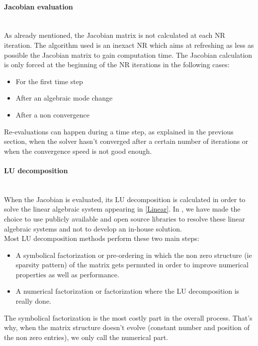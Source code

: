 \documentclass[a4paper, 12pt]{report}
\begin{document}
\paragraph{Jacobian evaluation}
~~\\

As already mentioned, the Jacobian matrix is not calculated at each \ac{NR} iteration. The algorithm used is an inexact \ac{NR} which aims at refreshing as less as possible the Jacobian matrix to gain computation time. The Jacobian calculation is only forced at the beginning of the \ac{NR} iterations in the following cases:
\begin{itemize}
\item For the first time step
\item After an algebraic mode change
\item After a non convergence
\end{itemize}

Re-evaluations can happen during a time step, as explained in the previous section, when the solver hasn't converged after a certain number of iterations or when the convergence speed is not good enough.

\paragraph{LU decomposition}
~~\\

When the Jacobian is evaluated, its LU decomposition is calculated in order to solve the linear algebraic system appearing in \eqref{Linear}. In \Dynawo , we have made the choice to use publicly available and open source libraries to resolve these linear algebraic systems and not to develop an in-house solution. \\

Most LU decomposition methods perform these two main steps:
\begin{itemize}
\item A symbolical factorization or pre-ordering in which the non zero structure (ie sparsity pattern) of the matrix gets permuted in order to improve numerical properties as well as performance.
\item A numerical factorization or factorization where the LU decomposition is really done.
\end{itemize}

The symbolical factorization is the most costly part in the overall process. That's why, when the matrix structure doesn't evolve (constant number and position of the non zero entries), we only call the numerical part.
\end{document}
